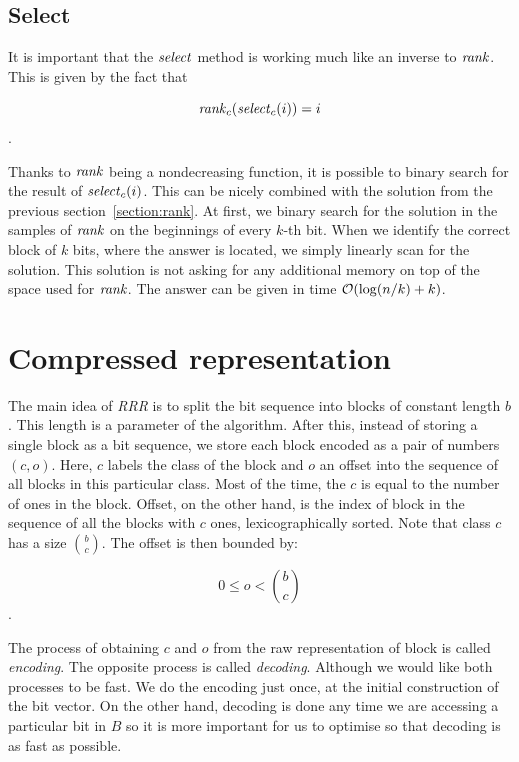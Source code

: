 
\subsection{Select}
\label{section:select}

It is important that the $\mathit{select}$ method is working much like an inverse to $\mathit{rank}$. This is given
by the fact that

                $$\mathit{rank}_c(\mathit{select}_c(i)) = i$$.

Thanks to $\mathit{rank}$ being a nondecreasing function, it is possible to binary search for the result
of $\mathit{select}_c(i)$. This can be nicely combined with the solution from the previous
section~\ref{section:rank}. At first, we binary search for the solution in the samples of $\mathit{rank}$
on the beginnings of every $k$-th bit. When we identify the correct block of $k$ bits, where
the answer is located, we simply linearly scan for the solution. This solution is not asking
for any additional memory on top of the space used for $\mathit{rank}$. The answer can be given in time
$\mathcal{O}(\log(n/k)+k)$.


\section{Compressed representation}
\label{section:compressed_bv}

The main idea of \textit{RRR} is to split the bit sequence into blocks of constant length $b$.
This length is a parameter of the algorithm. After this, instead
of storing a single block as a bit sequence, we store each block encoded as a pair
of numbers $(c, o)$. Here, $c$ labels the class of the block and $o$ an offset into
the sequence of all blocks in this particular class. Most of the time, the $c$ is equal
to the number of ones in the block. Offset, on the other hand, is the index of block in
the sequence of all the blocks with $c$ ones, lexicographically sorted. Note that
class $c$ has a size ${b\choose c}$. The offset is then bounded by:

				$$0 \leq o < {b\choose c}$$.

The process of obtaining $c$ and $o$ from the raw representation of block is called
\textit{encoding}. The opposite process is called \textit{decoding}. Although we would
like both processes to be fast. We do the encoding just once, at the initial construction
of the bit vector. On the other hand, decoding is done any time we are accessing a particular
bit in $B$ so it is more important for us to optimise so that decoding is as fast as possible.

